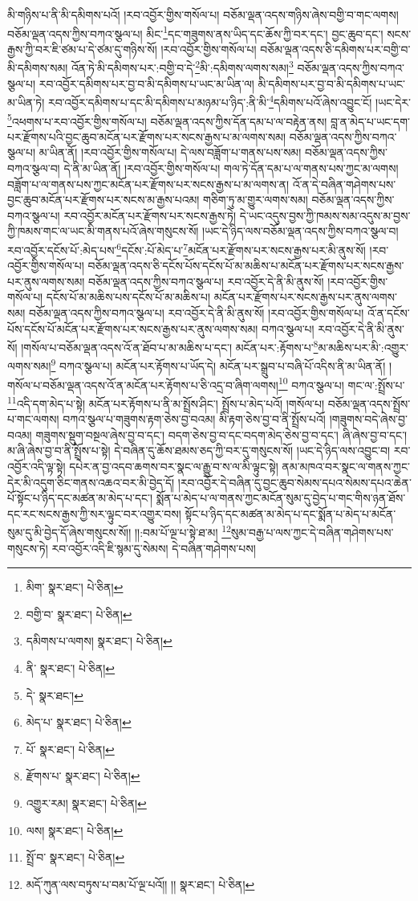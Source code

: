 མི་གཉིས་པ་ནི་མི་དམིགས་པའོ། །རབ་འབྱོར་གྱིས་གསོལ་པ། བཅོམ་ལྡན་འདས་གཉིས་ཞེས་བགྱི་བ་གང་ལགས། བཅོམ་ལྡན་འདས་ཀྱིས་བཀའ་སྩལ་པ། མིང་\footnote{མིག་  སྣར་ཐང་།  པེ་ཅིན། }དང་གཟུགས་ནས་ཡིད་དང་ཆོས་ཀྱི་བར་དང་། བྱང་ཆུབ་དང་། སངས་རྒྱས་ཀྱི་བར་ཇི་ཙམ་པ་དེ་ཙམ་དུ་གཉིས་སོ། །རབ་འབྱོར་གྱིས་གསོལ་པ། བཅོམ་ལྡན་འདས་ཅི་དམིགས་པར་བགྱི་བ་མི་དམིགས་སམ། འོན་ཏེ་མི་དམིགས་པར་:བགྱི་བ་དེ་\footnote{བགྱི་བ་  སྣར་ཐང་།  པེ་ཅིན། }མི་:དམིགས་ལགས་སམ།\footnote{དམིགས་པ་ལགས།  སྣར་ཐང་།  པེ་ཅིན། } བཅོམ་ལྡན་འདས་ཀྱིས་བཀའ་སྩལ་པ། རབ་འབྱོར་དམིགས་པར་བྱ་བ་མི་དམིགས་པ་ཡང་མ་ཡིན་ལ། མི་དམིགས་པར་བྱ་བ་མི་དམིགས་པ་ཡང་མ་ཡིན་ཏེ། རབ་འབྱོར་དམིགས་པ་དང་མི་དམིགས་པ་མཉམ་པ་ཉིད་:ནི་མི་\footnote{ནི་  སྣར་ཐང་།  པེ་ཅིན། }དམིགས་པའོ་ཞེས་འབྱུང་ངོ། །ཡང་དེར་\footnote{དེ་  སྣར་ཐང་། }འཕགས་པ་རབ་འབྱོར་གྱིས་གསོལ་པ། བཅོམ་ལྡན་འདས་ཀྱིས་དོན་དམ་པ་ལ་བརྟེན་ནས། བླ་ན་མེད་པ་ཡང་དག་པར་རྫོགས་པའི་བྱང་ཆུབ་མངོན་པར་རྫོགས་པར་སངས་རྒྱས་པ་མ་ལགས་སམ། བཅོམ་ལྡན་འདས་ཀྱིས་བཀའ་སྩལ་པ། མ་ཡིན་ནོ། །རབ་འབྱོར་གྱིས་གསོལ་པ། དེ་ལས་བཟློག་པ་གནས་པས་སམ། བཅོམ་ལྡན་འདས་ཀྱིས་བཀའ་སྩལ་བ། དེ་ནི་མ་ཡིན་ནོ། །རབ་འབྱོར་གྱིས་གསོལ་པ། གལ་ཏེ་དོན་དམ་པ་ལ་གནས་པས་ཀྱང་མ་ལགས། བཟློག་པ་ལ་གནས་པས་ཀྱང་མངོན་པར་རྫོགས་པར་སངས་རྒྱས་པ་མ་ལགས་ན། འོ་ན་དེ་བཞིན་གཤེགས་པས་བྱང་ཆུབ་མངོན་པར་རྫོགས་པར་སངས་མ་རྒྱས་པའམ། གཅིག་ཏུ་མ་གྱུར་ལགས་སམ། བཅོམ་ལྡན་འདས་ཀྱིས་བཀའ་སྩལ་པ། རབ་འབྱོར་མངོན་པར་རྫོགས་པར་སངས་རྒྱས་ཏེ། དེ་ཡང་འདུས་བྱས་ཀྱི་ཁམས་སམ་འདུས་མ་བྱས་ཀྱི་ཁམས་གང་ལ་ཡང་མི་གནས་པའོ་ཞེས་གསུངས་སོ། །ཡང་དེ་ཉིད་ལས་བཅོམ་ལྡན་འདས་ཀྱིས་བཀའ་སྩལ་བ། རབ་འབྱོར་དངོས་པོ་:མེད་པས་\footnote{མེད་པ་  སྣར་ཐང་།  པེ་ཅིན། }དངོས་:པོ་མེད་པ་\footnote{པོ་  སྣར་ཐང་།  པེ་ཅིན། }མངོན་པར་རྫོགས་པར་སངས་རྒྱས་པར་མི་ནུས་སོ། །རབ་འབྱོར་གྱིས་གསོལ་པ། བཅོམ་ལྡན་འདས་ཅི་དངོས་པོས་དངོས་པོ་མ་མཆིས་པ་མངོན་པར་རྫོགས་པར་སངས་རྒྱས་པར་ནུས་ལགས་སམ། བཅོམ་ལྡན་འདས་ཀྱིས་བཀའ་སྩལ་པ། རབ་འབྱོར་དེ་ནི་མི་ནུས་སོ། །རབ་འབྱོར་གྱིས་གསོལ་པ། དངོས་པོ་མ་མཆིས་པས་དངོས་པོ་མ་མཆིས་པ། མངོན་པར་རྫོགས་པར་སངས་རྒྱས་པར་ནུས་ལགས་སམ། བཅོམ་ལྡན་འདས་ཀྱིས་བཀའ་སྩལ་པ། རབ་འབྱོར་དེ་ནི་མི་ནུས་སོ། །རབ་འབྱོར་གྱིས་གསོལ་པ། འོ་ན་དངོས་པོས་དངོས་པོ་མངོན་པར་རྫོགས་པར་སངས་རྒྱས་པར་ནུས་ལགས་སམ། བཀའ་སྩལ་པ། རབ་འབྱོར་དེ་ནི་མི་ནུས་སོ། །གསོལ་པ་བཅོམ་ལྡན་འདས་འོ་ན་ཐོབ་པ་མ་མཆིས་པ་དང་། མངོན་པར་:རྟོགས་པ་\footnote{རྫོགས་པ་  སྣར་ཐང་།  པེ་ཅིན། }མ་མཆིས་པར་མི་:འགྱུར་ལགས་སམ།\footnote{འགྱུར་རམ།  སྣར་ཐང་།  པེ་ཅིན། } བཀའ་སྩལ་པ། མངོན་པར་རྟོགས་པ་ཡོད་དེ། མངོན་པར་སྒྲུབ་པ་བཞི་པོ་འདིས་ནི་མ་ཡིན་ནོ། །གསོལ་པ་བཅོམ་ལྡན་འདས་འོ་ན་མངོན་པར་རྟོགས་པ་ཅི་འདྲ་བ་ཞིག་ལགས།\footnote{ལས།  སྣར་ཐང་།  པེ་ཅིན། } བཀའ་སྩལ་པ། གང་ལ་:སྤྲོས་པ་\footnote{སྤྲོ་བ་  སྣར་ཐང་།  པེ་ཅིན། }འདི་དག་མེད་པ་སྟེ། མངོན་པར་རྟོགས་པ་ནི་མ་སྤྲོས་ཤིང་། སྤྲོས་པ་མེད་པའོ། །གསོལ་པ། བཅོམ་ལྡན་འདས་སྤྲོས་པ་གང་ལགས། བཀའ་སྩལ་པ་གཟུགས་རྟག་ཅེས་བྱ་བའམ། མི་རྟག་ཅེས་བྱ་བ་ནི་སྤྲོས་པའོ། །གཟུགས་བདེ་ཞེས་བྱ་བའམ། གཟུགས་སྡུག་བསྔལ་ཞེས་བྱ་བ་དང་། བདག་ཅེས་བྱ་བ་དང་བདག་མེད་ཅེས་བྱ་བ་དང་། ཞི་ཞེས་བྱ་བ་དང་། མ་ཞི་ཞེས་བྱ་བ་ནི་སྤྲོས་པ་སྟེ། དེ་བཞིན་དུ་ཆོས་ཐམས་ཅད་ཀྱི་བར་དུ་གསུངས་སོ། །ཡང་དེ་ཉིད་ལས་འབྱུང་བ། རབ་འབྱོར་འདི་ལྟ་སྟེ། དཔེར་ན་བྱ་འདབ་ཆགས་བར་སྣང་ལ་རྒྱུ་བ་ས་ལ་མི་ལྟུང་སྟེ། ནམ་མཁའ་བར་སྣང་ལ་གནས་ཀྱང་དེར་མི་འདུག་ཅིང་གནས་འཆའ་བར་མི་བྱེད་དོ། །རབ་འབྱོར་དེ་བཞིན་དུ་བྱང་ཆུབ་སེམས་དཔའ་སེམས་དཔའ་ཆེན་པོ་སྟོང་པ་ཉིད་དང་མཚན་མ་མེད་པ་དང་། སྨོན་པ་མེད་པ་ལ་གནས་ཀྱང་མངོན་སུམ་དུ་བྱེད་པ་གང་གིས་ཉན་ཐོས་དང་རང་སངས་རྒྱས་ཀྱི་སར་ལྟུང་བར་འགྱུར་བས། སྟོང་པ་ཉིད་དང་མཚན་མ་མེད་པ་དང་སྨོན་པ་མེད་པ་མངོན་སུམ་དུ་མི་བྱེད་དོ་ཞེས་གསུངས་སོ།། །།:བམ་པོ་ལྔ་པ་སྟེ་ཐ་མ། \footnote{མདོ་ཀུན་ལས་བཏུས་པ་བམ་པོ་ལྔ་པའོ།། །།   སྣར་ཐང་།  པེ་ཅིན། }སུམ་བརྒྱ་པ་ལས་ཀྱང་དེ་བཞིན་གཤེགས་པས་གསུངས་ཏེ། རབ་འབྱོར་འདི་ཇི་སྙམ་དུ་སེམས། དེ་བཞིན་གཤེགས་པས། 